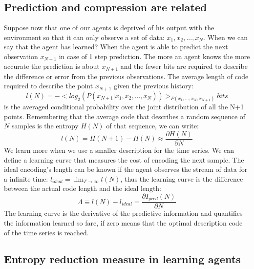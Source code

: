 \subsection{Prediction and compression are related}
Suppose now that one of our agents is deprived of his output with the environment
 so that it can only observe a set of data: $x_{1},x_{2},...,x_{N}$. When we can
 say that the agent has learned? When the agent is able to predict the next
observation $x_{N+1}$ in case of 1 step prediction. The more an agent knows
the more accurate the prediction is about $x_{N+1}$ and the fewer bits are
required to describe the difference or error from the previous observations.
The average length of code required to describe the point $x_{N+1}$ given
the previous history:
\begin{equation}
 l(N)=-<log_2(P(x_{N+1}|x_1,x_2,...,x_N))>_{P(x_1,...,x_N,x_{N+1})} bits
\end{equation}
is the averaged conditional probability over the joint distribution of all the
 N+1 points. Remembering that the average code that describes a random sequence
 of $N$ samples is the entropy $H(N)$ of that sequence, we can write:
\begin{equation}
 l(N)=H(N+1)-H(N)\approx \frac{\partial H(N)}{\partial N}
\end{equation}
We learn more when we use a smaller description for the time series.
We can define a learning curve that measures the cost of encoding the next sample.
The ideal encoding's length can be known if the agent observes the stream of
 data for a infinite time:
$l_{ideal}=\lim_{T\rightarrow \infty} l(N)$,
thus the learning curve is the difference between the actual code length and the ideal length:
\begin{equation}
\varLambda \equiv l(N)-l_{ideal}=\frac{\partial I_{pred}(N)}{\partial N}
\end{equation}
The learning curve is the derivative of the predictive information and quantifies the
information learned so fare, if zero means that the optimal description code of the time series
is reached.


\subsection{Entropy reduction measure in learning agents \label{Conclusion:PredictiveBayes}}

